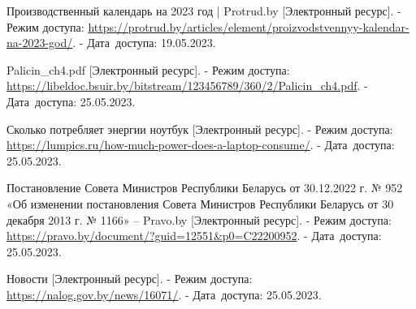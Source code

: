\begin{thebibliography}{}

    Производственный календарь на 2023 год | Protrud.by
    [Электронный ресурс].
    - Режим доступа: \url{https://protrud.by/articles/element/proizvodstvennyy-kalendar-na-2023-god/}.
    - Дата~доступа: 19.05.2023.

    Palicin\_ch4.pdf
    [Электронный ресурс].
    - Режим доступа: \url{https://libeldoc.bsuir.by/bitstream/123456789/360/2/Palicin_ch4.pdf}.
    - Дата~доступа: 25.05.2023.

    Сколько потребляет энергии ноутбук
    [Электронный ресурс].
    - Режим доступа: \url{https://lumpics.ru/how-much-power-does-a-laptop-consume/}.
    - Дата~доступа: 25.05.2023.
    
    Постановление Совета Министров Республики Беларусь от 30.12.2022 г. № 952 «Об изменении постановления Совета Министров Республики Беларусь от 30 декабря 2013 г. № 1166» – Pravo.by
    [Электронный ресурс].
    - Режим доступа: \url{https://pravo.by/document/?guid=12551&p0=C22200952}.
    - Дата~доступа: 25.05.2023.

    Новости
    [Электронный ресурс].
    - Режим доступа: \url{https://nalog.gov.by/news/16071/}.
    - Дата~доступа: 25.05.2023.
\end{thebibliography}
\endgroup

\newpage
